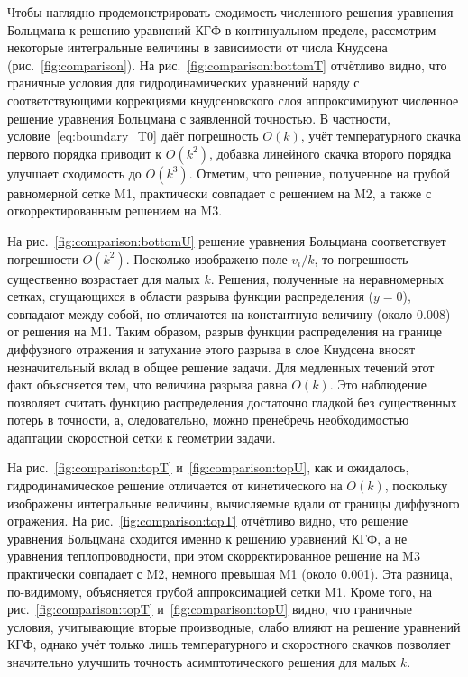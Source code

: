 \documentclass[
aps,%
12pt,%
final,%
notitlepage,%
oneside,%
onecolumn,%
nobibnotes,%
nofootinbib,%
superscriptaddress,%
noshowpacs,%
showkeys,%
floatfix,%
tightenlines,%
centertags]%
{revtex4}
\newcommand{\OO}[1]{O(#1)}
\begin{document}
Чтобы наглядно продемонстрировать сходимость численного решения уравнения Больцмана к
решению уравнений КГФ в континуальном пределе, рассмотрим некоторые интегральные величины
в зависимости от числа Кнудсена (рис.~\ref{fig:comparison}).
На рис.~\ref{fig:comparison:bottomT} отчётливо видно, что граничные условия для гидродинамических уравнений
наряду с соответствующими коррекциями кнудсеновского слоя
аппроксимируют численное решение уравнения Больцмана с заявленной точностью.
В частности, условие~\eqref{eq:boundary_T0} даёт погрешность \(\OO{k}\),
учёт температурного скачка первого порядка приводит к \(\OO{k^2}\),
добавка линейного скачка второго порядка улучшает сходимость до \(\OO{k^3}\).
Отметим, что решение, полученное на грубой равномерной сетке M1, практически совпадает с решением на M2,
а также с откорректированным решением на M3.

На рис.~\ref{fig:comparison:bottomU} решение уравнения Больцмана соответствует погрешности \(\OO{k^2}\).
Посколько изображено поле \(v_i/k\), то погрешность существенно возрастает для малых \(k\).
Решения, полученные на неравномерных сетках, сгущающихся в области разрыва функции распределения (\(y=0\)),
совпадают между собой, но отличаются на константную величину (около \(0.008\)) от решения на M1.
Таким образом, разрыв функции распределения на границе диффузного отражения и затухание этого разрыва в слое Кнудсена
вносят незначительный вклад в общее решение задачи. Для медленных течений этот факт объясняется тем,
что величина разрыва равна \(\OO{k}\). Это наблюдение позволяет считать функцию распределения достаточно гладкой
без существенных потерь в точности, а, следовательно, можно пренебречь необходимостью адаптации скоростной сетки
к геометрии задачи.

На рис.~\ref{fig:comparison:topT} и~\ref{fig:comparison:topU}, как и ожидалось, гидродинамическое решение
отличается от кинетического на \(\OO{k}\), поскольку изображены интегральные величины,
вычисляемые вдали от границы диффузного отражения.
На рис.~\ref{fig:comparison:topT} отчётливо видно, что решение уравнения Больцмана сходится
именно к решению уравнений КГФ, а не уравнения теплопроводности,
при этом скорректированное решение на M3 практически совпадает с M2, немного превышая M1 (около 0.001).
Эта разница, по-видимому, объясняется грубой аппроксимацией сетки M1.
Кроме того, на рис.~\ref{fig:comparison:topT} и~\ref{fig:comparison:topU} видно,
что граничные условия, учитывающие вторые производные, слабо влияют на решение уравнений КГФ,
однако учёт только лишь температурного и скоростного скачков позволяет значительно улучшить точность
асимптотического решения для малых \(k\).
\end{document}
